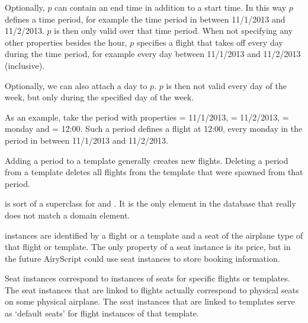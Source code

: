 \begin{description}
    Optionally, $p$ can contain an end time in addition to a start time. In this
    way $p$ defines a time period, for example the time period in between
    11/1/2013 and 11/2/2013. $p$ is then only valid over that time period. When
    not specifying any other properties besides the hour, $p$ specifies a flight
    that takes off every day during the time period, for example every day
    between 11/1/2013 and 11/2/2013 (inclusive).

    Optionally, we can also attach a day to $p$. $p$ is then not valid every
    day of the week, but only during the specified day of the week.

    As an example, take the period with properties  = 11/1/2013,
     = 11/2/2013,  = monday and  =
    12:00. Such a period defines a flight at 12:00, every monday in the period
    in between 11/1/2013 and 11/2/2013.

    Adding a period to a template generally creates new flights. Deleting a
    period from a template deletes all flights from the template that were
    spawned from that period.
    
  \item[\dbf{Bookable}] is sort of a superclass for  and
    . It is the only element in the database that really does not
    match a domain element.

  \item[\dbf{SeatInstance}] instances are identified by a flight or a template
    and a seat of the airplane type of that flight or template. The only
    property of a seat instance is its price, but in the future AiryScript could
    use seat instances to store booking information.
    
    Seat instances correspond to instances of seats for specific flights or
    templates. The seat instances that are linked to flights actually correspond
    to physical seats on some physical airplane. The seat instances that are
    linked to templates serve as ‘default seats’ for flight instances of that
    template.
\end{description}
